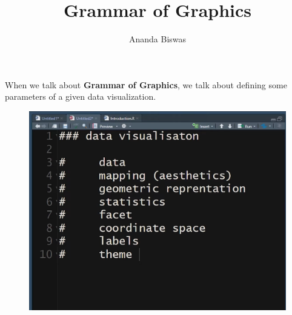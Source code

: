 \documentclass[11pt, a4paper]{article}\usepackage[]{graphicx}\usepackage[]{xcolor}
\title{Grammar of Graphics}
\author{Ananda Biswas}
\date{}
\begin{document}
\maketitle



When we talk about \textbf{Grammar of Graphics}, we talk about defining some parameters of a given data visualization.

\begin{figure}[h]
  \centering
  \includegraphics[scale = 0.15]{figure_1}
\end{figure}
\end{document}
